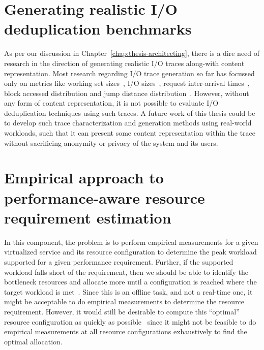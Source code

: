 \section{Generating realistic I/O deduplication benchmarks}
As per our discussion in Chapter~\ref{chap:thesis-architecting}, there
is a dire need of research in the direction of generating
realistic I/O traces along-with content representation. Most research
regarding I/O trace generation so far has focussed only on metrics
like working set sizes~\cite{working-set}, 
I/O sizes~\cite{flexi-replay}, 
request inter-arrival times~\cite{storagereplay},
block accessed distribution and
jump distance distribution~\cite{jump-based-synthetic}. However, 
without any form of content representation, it is not possible
to evaluate I/O deduplication techniques using such traces. 
A future work of this thesis could be to develop such trace 
characterization and generation methods using real-world
workloads, such that it can present some
content representation within the trace without sacrificing 
anonymity or privacy of the system and its users.


\section{Empirical approach to performance-aware resource requirement 
estimation}

In this component, the problem is to perform empirical measurements
for a given virtualized service and its resource configuration to
determine the peak workload supported for a given performance
requirement. Further, if the supported workload falls short of the
requirement, then we should be able to identify the
bottleneck resources and allocate more until a configuration is
reached where the target workload is met~\cite{sandpiper}.
Since this is an offline task,
and not a real-time one, it might be acceptable to do empirical
measurements to determine
the resource requirement. However, it would still be
desirable to compute this ``optimal'' resource configuration
as quickly as possible~\cite{cutting-corners} since it might not be feasible to
do empirical measurements at all resource configurations exhaustively
to find the optimal allocation.

